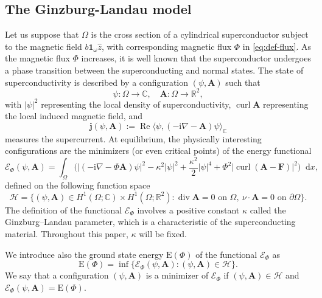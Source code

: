 \documentclass[11pt]{amsart}
\DeclareMathOperator{\curl}{curl}
\DeclareMathOperator{\re}{Re}
\DeclareMathOperator{\Div}{div}
\newcommand{\R}{\mathbb R}
\newcommand{\C}{\mathbb C}
\newcommand{\Ab}{\mathbf A}
\newcommand{\Fb}{\mathbf F}
\newcommand{\dd}{\mathop{}\!{\mathrm d}}
\newcommand{\ii}{\mathrm i}
\newcommand{\Ef}{\mathcal E_\Phi}
\newcommand{\En}{\mathrm E(\Phi)}
\newcommand{\jb}{\mathbf j}
\newcommand{\cH}{\mathcal H}
\theoremstyle{definition}
\numberwithin{equation}{section}
\begin{document}
\subsection{The Ginzburg-Landau model}
%
Let us suppose that $\Omega$ is the cross section of a cylindrical superconductor subject to the magnetic field  $b\mathbf 1_\omega\hat z$, with corresponding magnetic flux $\Phi$ in \eqref{eq:def-flux}. As the magnetic flux $\Phi$ increases, it is well known that the superconductor undergoes a phase transition between the superconducting and normal states.  The state of superconductivity  is described by a configuration $(\psi,\Ab)$ such that
\[
    \psi:\Omega\to\C,\quad \Ab:\Omega\to\R^2,
\]
with $|\psi|^2$ representing the local density of superconductivity,  $\curl\Ab$ representing the local induced magnetic field, and
\begin{equation}
    \label{eq:def-supercurrent}
    \jb(\psi,\Ab)
    :=
    \re \langle \psi,(-\ii\nabla - \Ab)\psi\rangle_{\C}
\end{equation}
measures the supercurrent. At equilibrium, the physically interesting configurations are the minimizers (or even critical points) of the energy functional
\begin{equation}\label{eq:def-GL}
\Ef(\psi,\Ab)=\int_\Omega\Biggl(|(-\ii\nabla-\Phi \Ab)\psi|^2-\kappa^2|\psi|^2+\frac{\kappa^2}{2}|\psi|^4+\Phi^2|\curl(\Ab-\Fb)|^2\Biggr)\dd x,
\end{equation}
defined on the following function space
\begin{equation}\label{eq:def-space}
    \cH
    =
    \{
        (\psi,\Ab)\in H^1(\Omega;\C)\times H^1(\Omega;\R^2)\colon
        \Div\Ab=0\text{ on }\Omega,~\nu\cdot\Ab=0\text{ on }\partial\Omega
    \}.
\end{equation}
The definition of the functional $\Ef$ involves a positive constant $\kappa$ called the Ginzburg--Landau parameter, which is a characteristic of the superconducting material. Throughout this paper, $\kappa$ will be fixed.

We introduce also the ground state energy \(\En\) of the functional $\Ef$ as
\begin{equation}\label{eq:def-energy}
\En=\inf\{\Ef(\psi,\Ab)\colon (\psi,\Ab)\in\cH\}.
\end{equation}
We say that a configuration $(\psi,\Ab)$ is a minimizer of $\Ef$ if $(\psi,\Ab)\in\cH$ and $\Ef(\psi,\Ab)=\En$.
%
\end{document}
